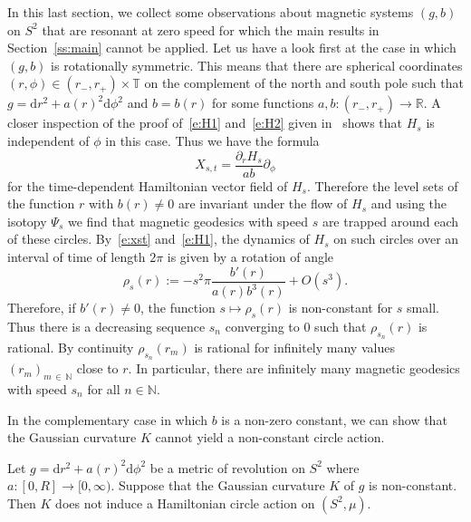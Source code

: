 \documentclass[AHL,Unicode,longabstracts,published]{cedram}
\newcommand{\N}{\mathbb{N}}
\newcommand{\R}{\mathbb{R}}
\newcommand{\T}{\mathbb{T}}
\newcommand{\diff}{\mathrm{d}}
\begin{document}
In this last section, we collect some observations about magnetic systems $(g,b)$ on $S^2$ that are resonant at zero speed for which the main results in Section~\ref{ss:main} cannot be applied. Let us have a look first at the case in which $(g,b)$ is rotationally symmetric. This means that there are spherical coordinates $(r,\phi)\in(r_-,r_+)\times\T$ on the complement of the north and south pole such that $g=\diff r^2+a(r)^2\diff \phi^2$ and $b=b(r)$ for some functions $a,b:(r_-,r_+)\to\R$. A closer inspection of the proof of~\eqref{e:H1} and~\eqref{e:H2} given in~\cite[Section~3]{AB21} shows that $H_s$ is independent of $\phi$ in this case. Thus we have the formula
\begin{equation}\label{e:xst}
X_{s,t}=\frac{\partial_r H_s}{ab}\partial_\phi
\end{equation}
for the time-dependent Hamiltonian vector field of $H_s$. Therefore the level sets of the function $r$ with $b(r)\neq0$ are invariant under the flow of $H_s$ and using the isotopy $\Psi_s$ we find that magnetic geodesics with speed $s$ are trapped around each of these circles. By~\eqref{e:xst} and~\eqref{e:H1}, the dynamics of $H_s$ on such circles over an interval of time of length $2\pi$ is given by a rotation of angle
\[
\rho_s(r):=-s^2\pi \frac{b'(r)}{a(r)b^3(r)}+O(s^3).
\]
Therefore, if $b'(r)\neq0$, the function $s\mapsto \rho_s(r)$ is non-constant for $s$ small. Thus there is a decreasing sequence $s_n$ converging to $0$ such that $\rho_{s_n}(r)$ is rational. By continuity $\rho_{s_n}(r_m)$ is rational for infinitely many values $(r_m)_{m\,\in\,\N}$ close to $r$. In particular, there are infinitely many magnetic geodesics with speed $s_n$ for all $n\in\N$.

In the complementary case in which $b$ is a non-zero constant, we can show that the Gaussian curvature $K$ cannot yield a non-constant circle action.


\begin{theo}\label{thm:curvaturenonresonant}
Let $g=\diff r^2+a(r)^2\diff\phi^2$ be a metric of revolution on $S^2$ where $a:[0,R]\to[0,\infty)$. Suppose that the Gaussian curvature $K$ of $g$ is non-constant. Then $K$ does not induce a Hamiltonian circle action on $(S^2,\mu)$.
\end{theo}
\end{document}

